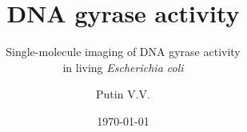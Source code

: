 \title{DNA gyrase activity}
\subtitle{Single-molecule imaging of DNA gyrase activity \\ in living \textit{Escherichia coli}}
\author{Putin V.V.}
\date{\today}
            
